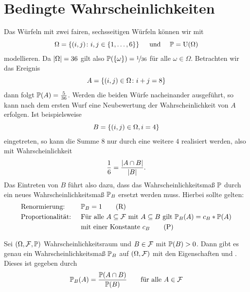 \section{Bedingte Wahrscheinlichkeiten}
\begin{beispiel}\label{beispiel: 3_1_1_wuerfel}
	Das Würfeln mit zwei fairen, sechsseitigen Würfeln können wir mit 
	\begin{equation*}
		\Omega = \menge{(i,j) \colon i,j \in \menge{1,\dots,6}} \quad \und \quad \P = \Uni(\Omega)
	\end{equation*}
	modellieren. Da $\abs{\Omega} = 36$ gilt also $\P(\menge{\omega}) = \lfrac{1}{36}$ für alle $\omega \in \Omega$. Betrachten wir das Ereignis
	\begin{equation*}
		A = \menge{(i,j) \in \Omega \colon i + j = 8}
	\end{equation*}
	dann folgt $\P(A) = \frac{5}{36}$.	Werden die beiden Würfe nacheinander ausgeführt, so kann nach dem ersten Wurf eine Neubewertung der Wahrscheinlichkeit von $A$ erfolgen. Ist beispielsweise
	\begin{equation*}
		B = \menge{(i,j) \in \Omega, i = 4}
	\end{equation*} 
	eingetreten, so kann die Summe $8$ nur durch eine weitere $4$ realisiert werden, also mit Wahrscheinlichkeit
	\begin{equation*}
		\frac{1}{6} = \frac{\abs{A \cap B}}{\abs{B}}. 
	\end{equation*}
	Das Eintreten von $B$ führt also dazu, dass das Wahrscheinlichkeitsmaß $\P$ durch ein neues Wahrscheinlichkeitsmaß $\P_{B}$ ersetzt werden muss. Hierbei sollte gelten:
	\begin{align}
		&\text{Renormierung: } &&\P_{B} = 1 \label{eq: Renormierung} \tag{R}\\
		&\text{Proportionalität: } &&\text{Für alle } A \subseteq \F \mit A \subseteq B \text{ gilt } \P_{B}(A) = c_B * \P(A) \notag \\ 
		&&&\text{mit einer Konstante } c_B \label{eq: Proportionalitaet} \tag{P}
	\end{align}
\end{beispiel}

\begin{lemma}
	Sei $(\Omega, \F, \P)$ Wahrscheinlichkeitsraum und $B \in \F$ mit $\P(B) > 0$. Dann gibt es genau ein Wahrscheinlichkeitsmaß $\P_B$ auf $(\Omega, \F)$ mit den Eigenschaften  und . Dieses ist gegeben durch
	\begin{equation*}
		\P_B(A) = \frac{\P(A \cap B)}{\P(B)} \qquad \text{für alle } A \in \F
	\end{equation*}
\end{lemma}

